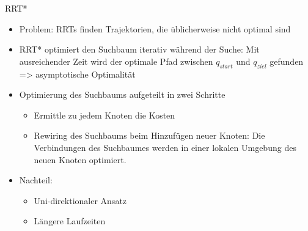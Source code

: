\documentclass[paper=a4, fontsize=11pt]{scrartcl} %
\numberwithin{equation}{section} %
\numberwithin{figure}{section} %
\numberwithin{table}{section} %
\begin{document}
RRT*
\begin{itemize}
\item Problem: RRTs finden Trajektorien, die üblicherweise nicht optimal sind
\item RRT* optimiert den Suchbaum iterativ während der Suche: Mit ausreichender Zeit wird der optimale Pfad zwischen $q_{start}$ und $q_{ziel}$ gefunden => asymptotische Optimalität
\item Optimierung des Suchbaums aufgeteilt in zwei Schritte
\begin{itemize}
\item Ermittle zu jedem Knoten die Kosten
\item Rewiring des Suchbaums beim Hinzufügen neuer Knoten: Die Verbindungen des Suchbaumes werden in einer lokalen Umgebung des neuen Knoten optimiert.
\end{itemize}
\item Nachteil:
\begin{itemize}
\item Uni-direktionaler Ansatz
\item Längere Laufzeiten
\end{itemize}
\end{itemize}
\end{document}
